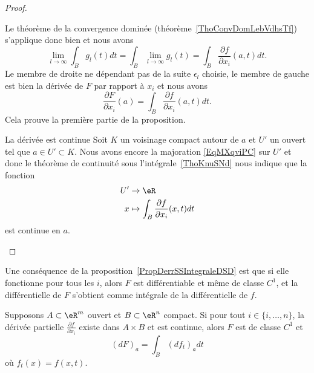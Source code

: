 \begin{proof}
\begin{subproof}
		Le théorème de la convergence dominée (théorème~\ref{ThoConvDomLebVdhsTf}) s'applique donc bien et nous avons
		\begin{equation}
			\lim_{l\to \infty} \int_Bg_l(t)dt=\int_B\lim_{l\to \infty} g_l(t)=\int_B\frac{ \partial f }{ \partial x_i }(a,t)dt.
		\end{equation}
		Le membre de droite ne dépendant pas de la suite \( \epsilon_l\) choisie, le membre de gauche est bien la dérivée de \( F\) par rapport à \( x_i\) et nous avons
		\begin{equation}
			\frac{ \partial F }{ \partial x_i }(a)=\int_B\frac{ \partial f }{ \partial x_i }(a,t)dt.
		\end{equation}
		Cela prouve la première partie de la proposition.

		\item[La dérivée est continue]
		Soit \( K\) un voisinage compact autour de \( a\) et \( U'\) un ouvert tel que \( a\in U'\subset K\). Nous avons encore la majoration \eqref{EqMXqviPC} sur \( U'\) et donc le théorème de continuité sous l'intégrale~\ref{ThoKnuSNd} nous indique que la fonction
		\begin{equation}
			\begin{aligned}
				U' & \to \eR                                                    \\
				x  & \mapsto \int_{B}\frac{ \partial f }{ \partial x_i }(x,t)dt
			\end{aligned}
		\end{equation}
		est continue en \( a\).

	\end{subproof}
\end{proof}

Une conséquence de la proposition~\ref{PropDerrSSIntegraleDSD} est que si elle fonctionne pour tous les \( i\), alors \( F\) est différentiable et même de classe \( C^1\), et la différentielle de \( F\) s'obtient comme intégrale de la différentielle de \( f\).

\begin{proposition}\label{PropAOZkDsh}
	Supposons \( A\subset\eR^m\) ouvert et \( B\subset\eR^n\) compact. Si pour tout \( i\in\{ i,\ldots,n \}\), la dérivée partielle \( \frac{ \partial f }{ \partial x_i }\) existe dans \( A\times B\) et est continue, alors \( F\) est de classe \( C^1\) et
	\begin{equation}
		(dF)_a=\int_B(df_t)_adt
	\end{equation}
	où \( f_t(x)=f(x,t)\).
\end{proposition}

